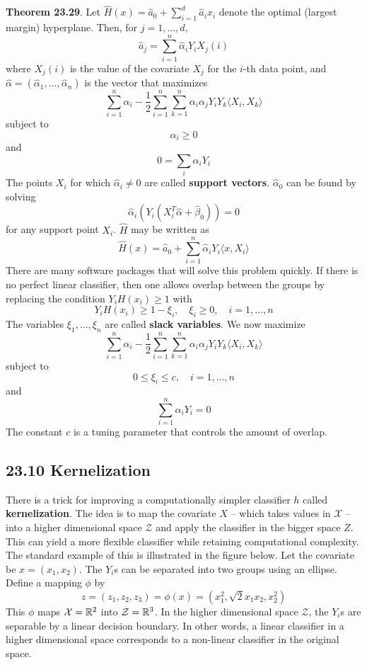 \textbf{Theorem 23.29}. Let
\(\hat{H}(x) = \hat{a}_{0} + \sum_{i=1}^{d} \hat{a}_{i} x_{i}\) denote the
optimal (largest margin) hyperplane. Then, for \(j = 1, \dots, d\),
\[
\hat{a}_{j} = \sum_{i=1}^{n} \hat{\alpha}_{i} Y_{i} X_{j}(i)
\]
where \(X_{j}(i)\) is the value of the covariate \(X_{j}\) for the \(i\)-th
data point, and
\(\hat{\alpha} = (\hat{\alpha}_{1}, \dots, \hat{\alpha}_{n})\) is the vector
that maximizes
\[
\sum_{i=1}^{n} \alpha_{i} - \frac{1}{2} \sum_{i=1}^{n} \sum_{k=1}^{n} \alpha_{i} \alpha_{j} Y_{i} Y_{k} \langle X_{i}, X_{k} \rangle
\]
subject to
\[
\alpha_{i} \geq 0
\]
and
\[
0 = \sum_{i} \alpha_{i} Y_{i}
\]
The points \(X_{i}\) for which \(\hat{\alpha}_{i} \neq 0\) are called
\textbf{support vectors}. \(\hat{\alpha}_{0}\) can be found by solving
\[
\hat{\alpha}_{i}(Y_{i} (X_{i}^T \hat{\alpha} + \hat{\beta}_{0})) = 0
\]
for any support point \(X_{i}\). \(\hat{H}\) may be written as
\[
\hat{H}(x) = \hat{a}_{0} + \sum_{i=1}^{n} \hat{\alpha}_{i} Y_{i} \langle x, X_{i} \rangle
\]
There are many software packages that will solve this problem quickly.
If there is no perfect linear classifier, then one allows overlap
between the groups by replacing the condition \(Y_{i} H(x_{i}) \geq 1\) with
\[
Y_{i} H(x_{i}) \geq 1 - \xi_{i},
\quad \xi_{i} \geq 0,
\quad i = 1, \dots, n
\]
The variables \(\xi_{1}, \dots, \xi_{n}\) are called \textbf{slack
variables}. We now maximize
\[
\sum_{i=1}^{n} \alpha_{i} - \frac{1}{2} \sum_{i=1}^{n} \sum_{k=1}^{n} \alpha_{i} \alpha_{j} Y_{i} Y_{k} \langle X_{i}, X_{k} \rangle
\]
subject to
\[
0 \leq \xi_{i} \leq c, \quad i = 1, \dots, n
\]
and
\[
\sum_{i=1}^{n} \alpha_{i} Y_{i} = 0
\]
The constant \(c\) is a tuning parameter that controls the amount of
overlap.

\subsection*{23.10 Kernelization}\label{kernelization}
There is a trick for improving a computationally simpler classifier
\(h\) called \textbf{kernelization}. The idea is to map the covariate
\(X\) -- which takes values in \(\mathcal{X}\) -- into a higher
dimensional space \(\mathcal{Z}\) and apply the classifier in the bigger
space \(Z\). This can yield a more flexible classifier while retaining
computational complexity.
The standard example of this is illustrated in the figure below. Let the
covariate be \(x = (x_{1}, x_{2})\). The \(Y_{i}\)s can be separated into two
groups using an ellipse. Define a mapping \(\phi\) by
\[
z = (z_{1}, z_{2}, z_{3}) = \phi(x) = (x_{1}^{2}, \sqrt{2} x_{1} x_{2}, x_{2}^{2})
\]
This \(\phi\) maps \(\mathcal{X} = \mathbb{R}^{2}\) into
\(\mathcal{Z} = \mathbb{R}^{3}\). In the higher dimensional space
\(\mathcal{Z}\), the \(Y_{i}\)s are separable by a linear decision
boundary. In other words, a linear classifier in a higher dimensional
space corresponds to a non-linear classifier in the original space.


